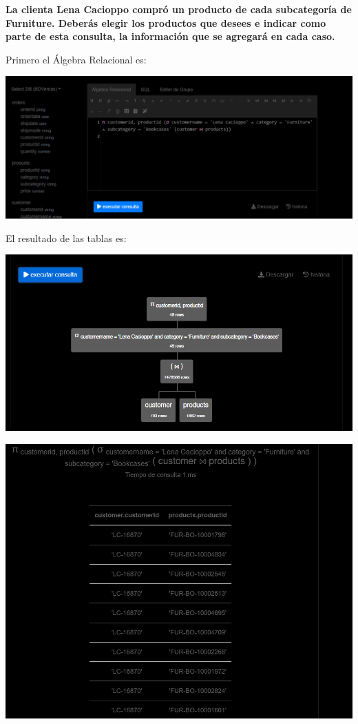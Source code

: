 \textbf{La clienta Lena Cacioppo compró un producto de cada subcategoría de Furniture. Deberás elegir los productos que
desees e indicar como parte de esta consulta, la información que se agregará en cada caso.} \vspace{.3cm}

Primero el Álgebra Relacional es:

\begin{center}
    \includegraphics[width=14cm]{resources/pregunta2/3.3.1.png}
\end{center}


El resultado de las tablas es:

\begin{center}
    \includegraphics[width=14cm]{resources/pregunta2/3.3.3.png}
\end{center}

\begin{center}
    \includegraphics[width=14cm]{resources/pregunta2/3.3.2.png}
\end{center}
